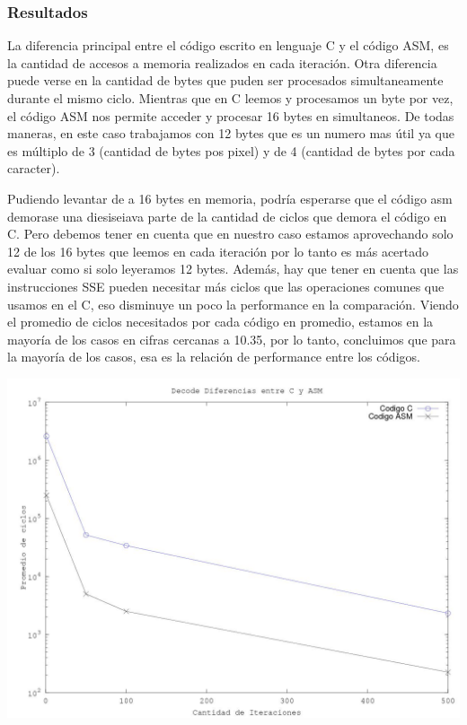 \subsubsection{Resultados}
La diferencia principal entre el c\'odigo escrito en lenguaje C y el c\'odigo ASM, es la cantidad de accesos a memoria realizados en cada iteraci\'on. Otra diferencia puede verse en la cantidad de bytes que puden ser procesados simultaneamente durante el mismo ciclo. Mientras que en C leemos y procesamos un byte por vez, el c\'odigo ASM nos permite acceder y procesar 16 bytes en simultaneos. De todas maneras, en este caso trabajamos con 12 bytes que es un numero mas \'util ya que es m\'ultiplo de 3 (cantidad de bytes pos pixel)  y de 4 (cantidad de bytes por cada caracter).

\newline
Pudiendo levantar de a 16 bytes en memoria, podr\'ia esperarse que el c\'odigo asm demorase una diesiseiava parte de la cantidad de ciclos que demora el c\'odigo en C. Pero debemos tener en cuenta que en nuestro caso estamos aprovechando solo 12 de los 16 bytes que leemos en cada iteraci\'on por lo tanto es más acertado evaluar como si solo leyeramos 12 bytes. Adem\'as, hay que tener en cuenta que las instrucciones SSE pueden necesitar más ciclos que las operaciones comunes que usamos en el C, eso disminuye un poco la performance en la comparación. Viendo el promedio de ciclos necesitados por cada c\'odigo en promedio, estamos en la mayor\'ia de los casos en cifras cercanas a 10.35, por lo tanto, concluimos que para la mayoría de los casos, esa es la relaci\'on de performance entre los códigos.
\newline

\includegraphics[scale=0.7]{imagenes/octave1.jpg}

